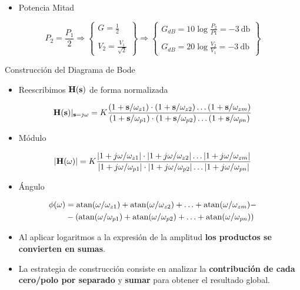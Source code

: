 \begin{itemize}
\item Potencia Mitad
\end{itemize}

\[
  P_2 = \frac{P_1}{2} \Rightarrow
  \left\{
  \begin{array}{c}
    G = \frac{1}{2}\\
    \\
    V_2 = \frac{V_1}{\sqrt{2}}
  \end{array}
  \right\}
  \Rightarrow
  \left\{
  \begin{array}{c}
    G_{dB} = 10 \log \frac{P_2}{P1} = -\SI{3}{\decibel}\\
    \\
    G_{dB} = 20 \log \frac{V_2}{V_1} = -\SI{3}{\decibel}
  \end{array}
  \right\}
\]

{Construcción del Diagrama de Bode}
\begin{itemize}
\item Reescribimos \(\mathbf{H}(\mathbf{s})\) de forma normalizada
\end{itemize}
\[
  \mathbf{H}(\mathbf{s})\rvert_{\mathbf{s} =j\omega} = K \frac{(1 + \mathbf{s}/\omega_{z1}) \cdot (1 + \mathbf{s}/\omega_{z2}) \ldots (1 + \mathbf{s}/\omega_{zm})}{(1 + \mathbf{s}/\omega_{p1}) \cdot (1 + \mathbf{s}/\omega_{p2}) \ldots (1 + \mathbf{s}/\omega_{pn})} 
\]
\begin{itemize}
\item Módulo
\end{itemize}
\[
  |\mathbf{H}(\omega)| = K \frac{|1 + j\omega/\omega_{z1}| \cdot |1 + j\omega/\omega_{z2}| \ldots |1 + j\omega/\omega_{zm}|}{|1 + j\omega/\omega_{p1}| \cdot |1 + j\omega/\omega_{p2}| \ldots |1 + j\omega/\omega_{pn}|} 
\]

\begin{itemize}
\item Ángulo
\end{itemize}
\begin{align*}
\phi(\omega) &= \mathrm{atan}(\omega/\omega_{z1}) + \mathrm{atan}(\omega/\omega_{z2}) + \ldots + \mathrm{atan}(\omega/\omega_{zm}) - \\
&- \left(\mathrm{atan}(\omega/\omega_{p1}) + \mathrm{atan}(\omega/\omega_{p2}) + \ldots + \mathrm{atan}(\omega/\omega_{pn})\right) 
\end{align*}


\begin{itemize}
\item Al aplicar logaritmos a la expresión de la amplitud \textbf{los productos se convierten en sumas}.
\item La estrategia de construcción consiste en analizar la \textbf{contribución de cada cero/polo por separado} y \textbf{sumar} para obtener el resultado global.
\end{itemize}

